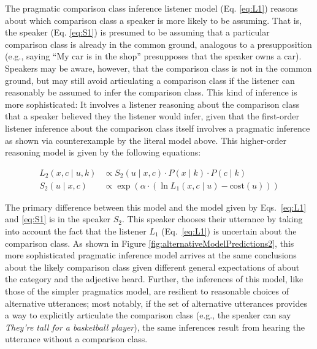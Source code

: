 \documentclass[doc]{apa6}
\begin{document}
The pragmatic comparison class inference listener model (Eq. \ref{eq:L1}) reasons about which comparison class a speaker is more likely to be assuming.
That is, the speaker (Eq. \ref{eq:S1}) is presumed to be assuming that a particular comparison class is already in the common ground, analogous to a presupposition (e.g., saying ``My car is in the shop'' presupposes that the speaker owns a car). 
Speakers may be aware, however, that the comparison class is not in the common ground, but may still avoid articulating a comparison class if the listener can reasonably be assumed to infer the comparison class. This kind of inference is more sophisticated: It involves a listener reasoning about the comparison class that a speaker believed they the listener would infer, given that the first-order listener inference about the comparison class itself involves a pragmatic inference as shown via counterexample by the literal model above. This higher-order reasoning model is given by the following equations:

\begin{align}
L_2(x, c \mid u, k) &\propto S_2(u \mid x, c) \cdot P(x \mid k) \cdot P(c \mid k) \label{eq:L2} \\
S_2(u \mid x, c) &\propto \exp{(\alpha \cdot (\ln L_{1}(x, c \mid u) - \text{cost}(u) ))}\label{eq:S2} 
\end{align}

The primary difference between this model and the model given by Eqs.~\ref{eq:L1} and \ref{eq:S1} is in the speaker $S_2$.
This speaker chooses their utterance by taking into account the fact that the listener $L_1$ (Eq.~\ref{eq:L1}) is uncertain about the comparison class. 
As shown in Figure \ref{fig:alternativeModelPredictions2}, this more sophisticated pragmatic inference model arrives at the same conclusions about the likely comparison class given different general expectations of about the category and the adjective heard.
Further, the inferences of this model, like those of the simpler pragmatics model, are resilient to reasonable choices of alternative utterances; most notably, if the set of alternative utterances provides a way to explicitly articulate the comparison class (e.g., the speaker can say \emph{They're tall for a basketball player}), the same inferences result from hearing the utterance without a comparison class.


\end{document}

